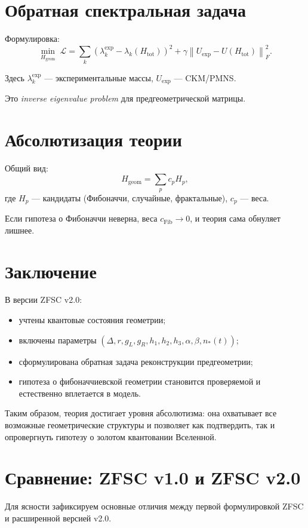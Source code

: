 \documentclass[12pt,a4paper]{article}
\begin{document}
\section{Обратная спектральная задача}
Формулировка:
\[
\min_{H_{\mathrm{geom}}} \; \mathcal{L} = \sum_k \left( \lambda_k^{\mathrm{exp}} - \lambda_k(H_{\mathrm{tot}}) \right)^2
+ \gamma \left\| U_{\mathrm{exp}} - U(H_{\mathrm{tot}}) \right\|_F^2 .
\]

Здесь $\lambda_k^{\mathrm{exp}}$ — экспериментальные массы, $U_{\mathrm{exp}}$ — CKM/PMNS.

Это \emph{inverse eigenvalue problem} для предгеометрической матрицы.

\section{Абсолютизация теории}
Общий вид:
\[
H_{\mathrm{geom}} = \sum_{p} c_p H_p ,
\]
где $H_p$ — кандидаты (Фибоначчи, случайные, фрактальные), $c_p$ — веса.

Если гипотеза о Фибоначчи неверна, веса $c_{\mathrm{Fib}} \to 0$, и теория сама обнуляет лишнее.

\section{Заключение}
В версии ZFSC v2.0:
\begin{itemize}
    \item учтены квантовые состояния геометрии;
    \item включены параметры $(\Delta, r, g_L, g_R, h_1,h_2,h_3, \alpha, \beta, n_*(t))$;
    \item сформулирована обратная задача реконструкции предгеометрии;
    \item гипотеза о фибоначчиевской геометрии становится проверяемой и естественно вплетается в модель.
\end{itemize}

Таким образом, теория достигает уровня абсолютизма: она охватывает все возможные геометрические структуры и позволяет как подтвердить, так и опровергнуть гипотезу о золотом квантовании Вселенной.

\section{Сравнение: ZFSC v1.0 и ZFSC v2.0}

Для ясности зафиксируем основные отличия между первой формулировкой ZFSC и расширенной версией v2.0.
\end{document}
